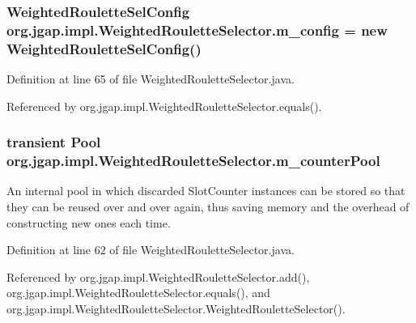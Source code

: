 \hypertarget{classorg_1_1jgap_1_1impl_1_1_weighted_roulette_selector_af9b7d0d34b65bf6e6a3841f9956f9cb5}{
\subsubsection[{m\-\_\-config}]{\setlength{\rightskip}{0pt plus 5cm}Weighted\-Roulette\-Sel\-Config org.\-jgap.\-impl.\-Weighted\-Roulette\-Selector.\-m\-\_\-config = new Weighted\-Roulette\-Sel\-Config()\hspace{0.3cm}{\ttfamily [private]}}}\label{classorg_1_1jgap_1_1impl_1_1_weighted_roulette_selector_af9b7d0d34b65bf6e6a3841f9956f9cb5}


Definition at line 65 of file Weighted\-Roulette\-Selector.\-java.



Referenced by org.\-jgap.\-impl.\-Weighted\-Roulette\-Selector.\-equals().

\hypertarget{classorg_1_1jgap_1_1impl_1_1_weighted_roulette_selector_ab3dc747b69b4d746dd6b0e1c8556dcdd}{
\subsubsection[{m\-\_\-counter\-Pool}]{\setlength{\rightskip}{0pt plus 5cm}transient {\bf Pool} org.\-jgap.\-impl.\-Weighted\-Roulette\-Selector.\-m\-\_\-counter\-Pool\hspace{0.3cm}{\ttfamily [private]}}}\label{classorg_1_1jgap_1_1impl_1_1_weighted_roulette_selector_ab3dc747b69b4d746dd6b0e1c8556dcdd}
An internal pool in which discarded Slot\-Counter instances can be stored so that they can be reused over and over again, thus saving memory and the overhead of constructing new ones each time. 

Definition at line 62 of file Weighted\-Roulette\-Selector.\-java.



Referenced by org.\-jgap.\-impl.\-Weighted\-Roulette\-Selector.\-add(), org.\-jgap.\-impl.\-Weighted\-Roulette\-Selector.\-equals(), and org.\-jgap.\-impl.\-Weighted\-Roulette\-Selector.\-Weighted\-Roulette\-Selector().


